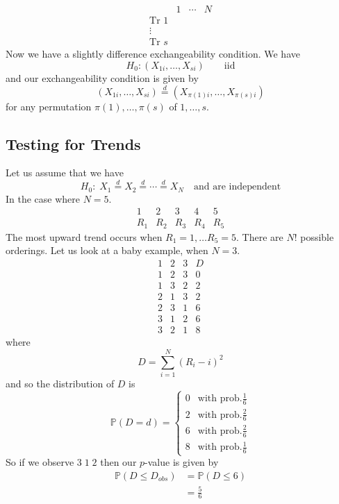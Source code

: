 \documentclass[a4paper,12pt]{amsart}
\newcommand{\sumiN}{\sum_{i=1}^N}
\newcommand{\p}[1]{\mathbb{P}\left(#1\right)}
\begin{document}
\[\begin{array}{c|c|c|c}
& 1 & \cdots & N\\
\hline
\text{Tr 1} & & &\\
\hline
\vdots & & & \\
\hline
\text{Tr }s & & &
\end{array}
\]
Now we have a slightly difference exchangeability condition. We have
\[H_0: (X_{1i}, \ldots, X_{si}) \qquad \text{iid}\]
and our exchangeability condition is given by
\[(X_{1i}, \ldots, X_{si}) \overset{d}{=} (X_{\pi(1)i}, \ldots, X_{\pi(s)i})\]
for any permutation $\pi(1), \ldots, \pi(s)$ of $1, \ldots, s$.

\subsection{Testing for Trends}
Let us assume that we have
\[H_0: \; X_1 \overset{d}{=} X_2 \overset{d}{=} \cdots \overset{d}{=}X_N \quad \text{and are independent}\]
In the case where $N=5$.
\[\begin{array}{c|c|c|c|c}
1 & 2 & 3 & 4& 5\\
\hline
R_1 & R_2 & R_3 & R_4 & R_5
\end{array} \]
The most upward trend occurs when $R_1 = 1, \ldots R_5 = 5$.
There are $N!$ possible orderings. Let us look at a baby example, when $N=3$.
\[\begin{array}{c|c|c|c}
1 & 2 & 3 & D\\
\hline
1 & 2 & 3 & 0\\
1 & 3 & 2 & 2\\
2 & 1 & 3 & 2\\
2 & 3 & 1 & 6\\
3 & 1 & 2 & 6\\
3 & 2 & 1 & 8
\end{array} \]
where
\[D = \sumiN (R_i - i)^2\]
and so the distribution of $D$ is
\[\p{D=d} =\begin{cases}
0 & \text{with prob.} \frac{1}{6}\\
2 & \text{with prob.} \frac{2}{6}\\
6 & \text{with prob.} \frac{2}{6}\\
8 & \text{with prob.} \frac{1}{6}
\end{cases} \]
So if we observe $3\;1\;2$ then our $p$-value is given by
\begin{align*}
\p{D \leq D_{obs}} &= \p{D \leq 6}\\
&= \frac{5}{6}
\end{align*}
\end{document}
